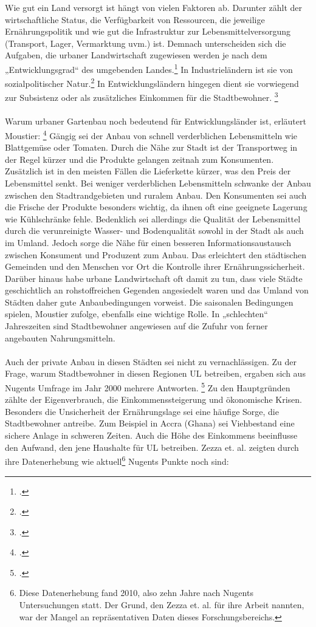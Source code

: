 \documentclass{scrartcl}
\begin{document}
Wie gut ein Land versorgt ist hängt von vielen Faktoren ab. Darunter zählt der wirtschaftliche Status, die Verfügbarkeit von Ressourcen, die jeweilige Ernährungspolitik und wie gut die Infrastruktur zur Lebensmittelversorgung (Transport, Lager, Vermarktung uvm.) ist. Demnach unterscheiden sich die Aufgaben, die urbaner Landwirtschaft zugewiesen werden je nach dem „Entwicklungsgrad“ des umgebenden Landes.\footcite{SmitUrbanToday} In Industrieländern ist sie von sozialpolitischer Natur.\footcites[][S. 21]{Berges2014UrbaneStadt}[S.26f]{SmitUrbanToday} In Entwicklungsländern hingegen dient sie vorwiegend zur Subsistenz oder als zusätzliches Einkommen für die Stadtbewohner. \footcites[Vgl.][S.75]{Nugent2000TheEconomies}[S.26f]{SmitUrbanToday}\\
\\
Warum urbaner Gartenbau noch bedeutend für Entwicklungsländer ist, erläutert Moustier: \footcites[Vgl.][S.6ff]{Moustier2007UrbanSupplier} Gängig sei der Anbau von schnell verderblichen Lebensmitteln wie Blattgemüse oder Tomaten. Durch die Nähe zur Stadt ist der Transportweg in der Regel kürzer und die Produkte gelangen zeitnah zum Konsumenten. Zusätzlich ist in den meisten Fällen die Lieferkette kürzer, was den Preis der Lebensmittel senkt. Bei weniger verderblichen Lebensmitteln schwanke der Anbau zwischen den Stadtrandgebieten und ruralem Anbau. Den Konsumenten sei auch die Frische der Produkte besonders wichtig, da ihnen oft eine geeignete Lagerung wie Kühlschränke fehle. Bedenklich sei allerdings die Qualität der Lebensmittel durch die verunreinigte Wasser- und Bodenqualität sowohl in der Stadt als auch im Umland. Jedoch sorge die Nähe für einen besseren Informationsaustausch zwischen Konsument und Produzent zum Anbau. Das erleichtert den städtischen Gemeinden und den Menschen vor Ort die Kontrolle ihrer Ernährungssicherheit. Darüber hinaus habe urbane Landwirtschaft oft damit zu tun, dass viele Städte geschichtlich an rohstoffreichen Gegenden angesiedelt waren und das Umland von Städten daher gute Anbaubedingungen vorweist. Die saisonalen Bedingungen spielen, Moustier zufolge, ebenfalls eine wichtige Rolle. In „schlechten“ Jahreszeiten sind Stadtbewohner angewiesen auf die Zufuhr von ferner angebauten Nahrungsmitteln. \\
\\
Auch der private Anbau in diesen Städten sei nicht zu vernachlässigen. Zu der Frage, warum Stadtbewohner in diesen Regionen UL betreiben, ergaben sich aus Nugents Umfrage im Jahr 2000 mehrere Antworten. \footcite[Vgl.][S.74]{Nugent2000TheEconomies} Zu den Hauptgründen zählte der Eigenverbrauch, die Einkommenssteigerung und ökonomische Krisen. Besonders die Unsicherheit der Ernährungslage sei eine häufige Sorge, die Stadtbewohner antreibe. Zum Beispiel in Accra (Ghana) sei Viehbestand eine sichere Anlage in schweren Zeiten. Auch die Höhe des Einkommens beeinflusse den Aufwand, den jene Haushalte für UL betreiben. Zezza et. al. zeigten durch ihre Datenerhebung wie aktuell\footnote{Diese Datenerhebung fand 2010, also zehn Jahre nach Nugents Untersuchungen statt. Der Grund, den Zezza et. al. für ihre Arbeit nannten, war der Mangel an repräsentativen Daten dieses Forschungsbereichs.} Nugents Punkte noch sind:
\end{document}
